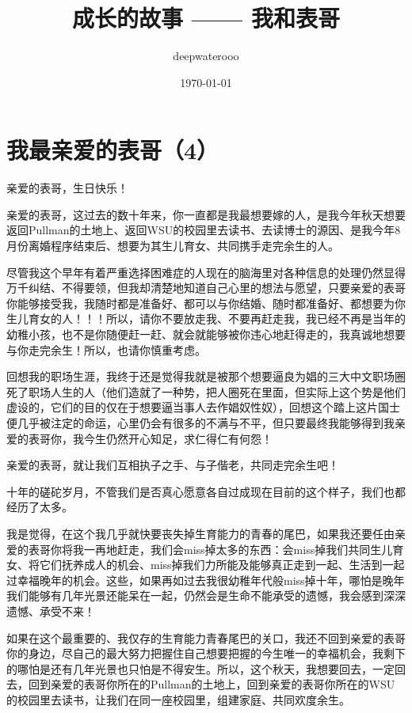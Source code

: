 \documentclass[9pt, b5paper]{article}
\author{deepwaterooo}
\date{\today}
\title{成长的故事 —— 我和表哥}
\begin{document}
\maketitle
\tableofcontents


\section{我最亲爱的表哥（4）}
\label{sec:orgebb3a73}

亲爱的表哥，生日快乐！

亲爱的表哥，这过去的数十年来，你一直都是我最想要嫁的人，是我今年秋天想要返回Pullman的土地上、返回WSU的校园里去读书、去读博士的源因、是我今年8月份离婚程序结束后、想要为其生儿育女、共同携手走完余生的人。

尽管我这个早年有着严重选择困难症的人现在的脑海里对各种信息的处理仍然显得万千纠结、不得要领，但我却清楚地知道自己心里的想法与愿望，只要亲爱的表哥你能够接受我，我随时都是准备好、都可以与你结婚、随时都准备好、都想要为你生儿育女的人！！！所以，请你不要放走我、不要再赶走我，我已经不再是当年的幼稚小孩，也不是你随便赶一赶、就会就能够被你违心地赶得走的，我真诚地想要与你走完余生！所以，也请你慎重考虑。

回想我的职场生涯，我终于还是觉得我就是被那个想要逼良为娼的三大中文职场圈死了职场人生的人（他们造就了一种势，把人圈死在里面，但实际上这个势是他们虚设的，它们的目的仅在于想要逼当事人去作娼奴性奴），回想这个踏上这片国士便几乎被注定的命运，心里仍会有很多的不满与不平，但只要最终我能够得到我亲爱的表哥你，我今生仍然开心知足，求仁得仁有何怨！

亲爱的表哥，就让我们互相执子之手、与子偕老，共同走完余生吧！

十年的磋砣岁月，不管我们是否真心愿意各自过成现在目前的这个样子，我们也都经历了太多。

我是觉得，在这个我几乎就快要丧失掉生育能力的青春的尾巴，如果我还要任由亲爱的表哥你将我一再地赶走，我们会miss掉太多的东西：会miss掉我们共同生儿育女、将它们抚养成人的机会、miss掉我们力所能及能够真正走到一起、生活到一起过幸福晚年的机会。这些，如果再如过去我很幼稚年代般miss掉十年，哪怕是晚年我们能够有几年光景还能呆在一起，仍然会是生命不能承受的遗憾，我会感到深深遗憾、承受不来！

如果在这个最重要的、我仅存的生育能力青春尾巴的关口，我还不回到亲爱的表哥你的身边，尽自己的最大努力把握住自己想要把握的今生唯一的幸福机会，我剩下的哪怕是还有几年光景也只怕是不得安生。所以，这个秋天，我想要回去，一定回去，回到亲爱的表哥你所在的Pullman的土地上，回到亲爱的表哥你所在的WSU的校园里去读书，让我们在同一座校园里，组建家庭、共同欢度余生。 
\end{document}
